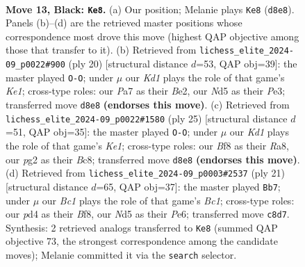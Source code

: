 \documentclass[11pt]{article}
\begin{document}
\clearpage

\begin{figure}[p]\centering
\begin{subfigure}{0.46\textwidth}\centering
\resizebox{\linewidth}{!}{%
\newchessgame
\chessboard[
  setfen={r1bk1b1r/ppq3pp/2p1p3/3nNp2/2BP4/1Q2P3/PP3PPP/R1B1K2R b KQ - 1 13},
  showmover=false,
  pgfstyle=straightmove, color=movearrow, markmove={d8-e8}
]}
\caption{}
\end{subfigure}\hfill
\begin{subfigure}{0.46\textwidth}\centering
\resizebox{\linewidth}{!}{%
\newchessgame
\chessboard[
  setfen={r1b1k2r/ppq2ppp/2p5/2bp4/4n3/1PP1PN2/P1Q1BPPP/R1B1K2R w KQkq - 1 11},
  showmover=false,
  pgfstyle=straightmove, color=movearrow, markmove={e1-g1}
]}
\caption{}
\end{subfigure}
\\[4pt]
\begin{subfigure}{0.46\textwidth}\centering
\resizebox{\linewidth}{!}{%
\newchessgame
\chessboard[
  setfen={r1b1k2r/3n1ppp/pq2p3/2bpP3/1p1N1P2/4B1P1/PPPQ3P/R3KB1R b KQkq - 0 13},
  showmover=false,
  pgfstyle=straightmove, color=movearrow, markmove={e8-g8}
]}
\caption{}
\end{subfigure}\hfill
\begin{subfigure}{0.46\textwidth}\centering
\resizebox{\linewidth}{!}{%
\newchessgame
\chessboard[
  setfen={r1b1kb1r/p1q2ppp/2p1pn2/1p2N3/8/1P1B4/P1PPQPPP/R1B1K2R b KQkq - 0 11},
  showmover=false,
  pgfstyle=straightmove, color=movearrow, markmove={c8-b7}
]}
\caption{}
\end{subfigure}
\caption{\textbf{Move 13, Black: \texttt{Ke8}.} (a) Our position; Melanie plays \texttt{Ke8} (\texttt{d8e8}). Panels (b)--(d) are the retrieved master positions whose correspondence most drove this move (highest QAP objective among those that transfer to it). (b) Retrieved from \texttt{lichess\_elite\_2024-09\_p0022\#900} (ply 20) [structural distance $d$=53, QAP obj=39]: the master played \texttt{O-O}; under $\mu$ our \emph{Kd1} plays the role of that game's \emph{Ke1}; cross-type roles: our \emph{P}a7 as their \emph{B}e2, our \emph{N}d5 as their \emph{P}e3; transferred move \texttt{d8e8} \textbf{(endorses this move)}. (c) Retrieved from \texttt{lichess\_elite\_2024-09\_p0022\#1580} (ply 25) [structural distance $d$=51, QAP obj=35]: the master played \texttt{O-O}; under $\mu$ our \emph{Kd1} plays the role of that game's \emph{Ke1}; cross-type roles: our \emph{B}f8 as their \emph{R}a8, our \emph{p}g2 as their \emph{B}c8; transferred move \texttt{d8e8} \textbf{(endorses this move)}. (d) Retrieved from \texttt{lichess\_elite\_2024-09\_p0003\#2537} (ply 21) [structural distance $d$=65, QAP obj=37]: the master played \texttt{Bb7}; under $\mu$ our \emph{Bc1} plays the role of that game's \emph{Bc1}; cross-type roles: our \emph{p}d4 as their \emph{B}f8, our \emph{N}d5 as their \emph{P}e6; transferred move \texttt{c8d7}. Synthesis: 2 retrieved analogs transferred to \texttt{Ke8} (summed QAP objective 73, the strongest correspondence among the candidate moves); Melanie committed it via the \texttt{search} selector.}
\label{fig:thought-m25}
\end{figure}
\end{document}
